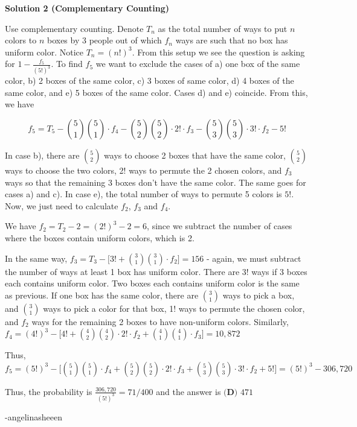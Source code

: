 \begin{enumerate}
 



\textbf{Solution 2 (Complementary Counting)}

Use complementary counting. Denote $T_n$ as the total number of ways to put $n$ colors to $n$ boxes by 3 people out of which $f_n$ ways are such that no box has uniform color. Notice $T_n = (n!)^3$. From this setup we see the question is asking for $1-\frac{f_5}{(5!)^3}$. To find $f_5$ we want to exclude the cases of a) one box of the same color, b) 2 boxes of the same color, c) 3 boxes of same color, d) 4 boxes of the same color, and e) 5 boxes of the same color. Cases d) and e) coincide. From this, we have

 
 \[f_5=T_5 -{\binom{5}{1}\binom{5}{1}\cdot f_4 - \binom{5}{2}\binom{5}{2}\cdot 2!\cdot f_3 - \binom{5}{3}\binom{5}{3}\cdot 3!\cdot f_2 - 5!}\]

 In case b), there are $\binom{5}{2}$ ways to choose 2 boxes that have the same color, $\binom{5}{2}$ ways to choose the two colors, 2! ways to permute the 2 chosen colors, and $f_3$ ways so that the remaining 3 boxes don’t have the same color. The same goes for cases a) and c). In case e), the total number of ways to permute 5 colors is $5!$. Now, we just need to calculate $f_2$, $f_3$ and $f_4$.

 We have $f_2=T_2-2 = (2!)^3 - 2 = 6$, since we subtract the number of cases where the boxes contain uniform colors, which is 2. 

 In the same way, $f_3=T_3-\Big[3!+ \binom{3}{1}\binom{3}{1}\cdot f_2 \Big] = 156$ - again, we must subtract the number of ways at least 1 box has uniform color. There are $3!$ ways if 3 boxes each contains uniform color. Two boxes each contains uniform color is the same as previous. If one box has the same color, there are $\binom{3}{1}$ ways to pick a box, and $\binom{3}{1}$ ways to pick a color for that box, 1! ways to permute the chosen color, and $f_2$ ways for the remaining 2 boxes to have non-uniform colors. Similarly, $f_4=(4!)^3-\Big[ 4!+ \binom{4}{2}\binom{4}{2}\cdot 2! \cdot f_2+ \binom{4}{1}\binom{4}{1}\cdot f_3\Big] = 10,872$

 Thus, $f_5=(5!)^3-\Big[\binom{5}{1}\binom{5}{1}\cdot f_4+ \binom{5}{2}\binom{5}{2}\cdot 2!\cdot f_3+\binom{5}{3}\binom{5}{3}\cdot 3!\cdot f_2 + 5!\Big] = (5!)^3 - 306,720$

 Thus, the probability is $\frac{306,720}{(5!)^3} = 71/400$ and the answer is $\boxed{\textbf{(D) }471}$

 -angelinasheeen


\end{enumerate}
